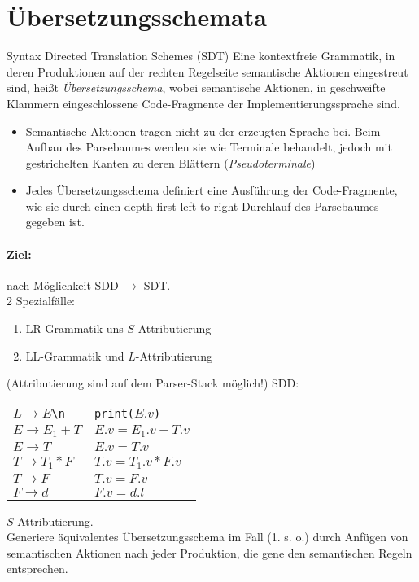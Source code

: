 \section{Übersetzungsschemata}
Syntax Directed Translation Schemes (SDT)
\Defi Eine kontextfreie Grammatik, in deren Produktionen auf der rechten Regelseite semantische Aktionen eingestreut sind, heißt \emph{Übersetzungsschema}, wobei semantische Aktionen, in geschweifte Klammern eingeschlossene Code-Fragmente der Implementierungssprache sind.
\begin{itemize}
 \item Semantische Aktionen tragen nicht zu der erzeugten Sprache bei. Beim Aufbau des Parsebaumes werden sie wie Terminale behandelt, jedoch mit gestrichelten Kanten zu deren Blättern (\emph{Pseudoterminale})
 \item Jedes Übersetzungsschema definiert eine Ausführung der Code-Fragmente, wie sie durch einen depth-first-left-to-right Durchlauf des Parsebaumes gegeben ist.
\end{itemize}
\paragraph*{Ziel:} nach Möglichkeit SDD $\rightarrow$ SDT. \\
2 Spezialfälle:
\begin{enumerate}
 \item LR-Grammatik uns $S$-Attributierung
 \item LL-Grammatik und $L$-Attributierung
\end{enumerate}
(Attributierung sind auf dem Parser-Stack möglich!)
\Bsp SDD:
\begin{center}
    \begin{tabular}{l|l}
        $L \to E$\verb!\n! & \verb!print(!$E.v$\verb!)! \\
        $E \to E_1 + T$ & $E.v = E_1.v + T.v$ \\
        $E \to T$ & $E.v = T.v$ \\
        $T \to T_1 * F$ & $T.v = T_1.v * F.v$ \\
        $T \to F$ & $T.v = F.v$\\
        $F \to d$ & $F.v = d.l$\\
    \end{tabular}
\end{center}
$S$-Attributierung.\\
Generiere äquivalentes Übersetzungsschema im Fall (1. s. o.) durch Anfügen von semantischen Aktionen nach jeder Produktion, die gene den semantischen Regeln entsprechen.
